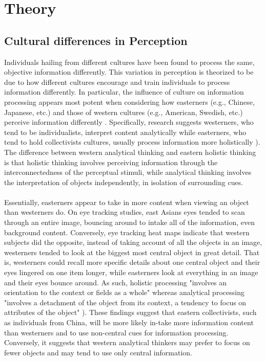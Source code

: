 
\chapter{Theory} %

\label{Theory} %




\section{Cultural differences in Perception}
Individuals hailing from different cultures have been found to process the same, objective information differently. This variation in perception is theorized to be due to how different cultures encourage and train individuals to process information differently. In particular, the influence of culture on information processing appears most potent when considering how easterners (e.g., Chinese, Japanese, etc.) and those of western cultures (e.g., American, Swedish, etc.) perceive information differently \cite{ji2000}. Specifically, research suggests westerners, who tend to be individualists, interpret content analytically while easterners, who tend to hold collectivists cultures, usually process information more holistically )\cite{miyamoto}. The difference between western analytical thinking and eastern holistic thinking is that holistic thinking involves perceiving information through the interconnectedness of the perceptual stimuli, while analytical thinking involves the interpretation of objects independently, in isolation of surrounding cues.\cite{Holistic_vs_Analytic}
\\\\
Essentially, easterners appear to take in more content when viewing an object than westerners do. On eye tracking studies, east Asians eyes tended to scan through an entire image, bouncing around to intake all of the information, even background content. Conversely, eye tracking heat maps indicate that western subjects did the opposite, instead of taking account of all the objects in an image, westerners tended to look at the biggest most central object in great detail. That is, westerners could recall more specific details about one central object and their eyes lingered on one item longer, while easterners look at everything in an image and their eyes bounce around. As such, holistic processing "involves an orientation to the context or fields as a whole" \cite{monga} whereas analytical processing "involves a detachment of the object from its context, a tendency to focus on attributes of the object" \cite{Holistic_vs_Analytic}). These findings suggest that eastern collectivists, such as individuals from China, will be more likely in-take more information content than westerners and to use non-central cues for information processing. Conversely, it suggests that western analytical thinkers may prefer to focus on fewer objects and may tend to use only central information.

